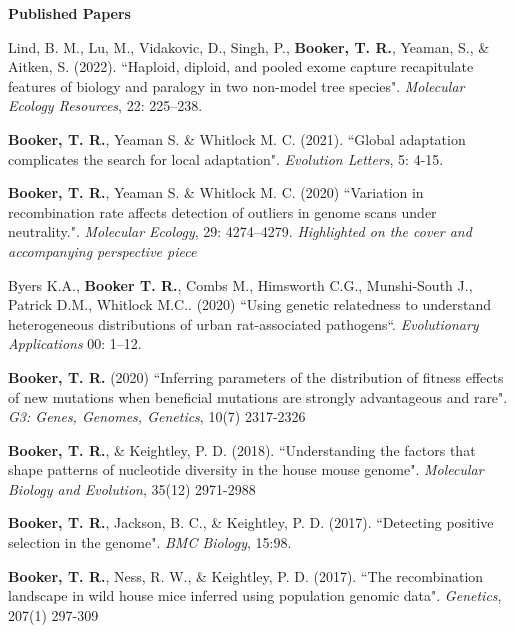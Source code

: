 \documentclass[11pt]{article}
\makeatletter
\newlength{\bibhang}
\newlength{\bibsep}
 {\@listi \global\bibsep\itemsep \global\advance\bibsep by\parsep}
\newenvironment{bibsection}%
        {\begin{etaremune}{}{%
       \setlength{\leftmargin}{\bibhang}%
       \setlength{\itemindent}{-\leftmargin}%
       \setlength{\itemsep}{\bibsep}%
       \setlength{\parsep}{\z@}%
        \setlength{\partopsep}{0pt}%
        \setlength{\topsep}{0pt}}}
        {\end{etaremune}\vspace{-.6\baselineskip}}
\makeatother
\begin{document}
\vspace{.1275in}
\textbf{Published Papers}

\begin{bibsection}


      \item Lind, B. M., Lu, M., Vidakovic, D., Singh, P., { \bf Booker, T. R.}, Yeaman, S., \& Aitken, S. (2022). ``Haploid, diploid, and pooled exome capture recapitulate features of biology and paralogy in two non-model tree species". \emph{Molecular Ecology Resources}, 22: 225–238. 
  
    \item {\bf Booker, T. R.}, Yeaman S. \& Whitlock M. C. (2021). ``Global adaptation complicates the search for local adaptation".  \emph{Evolution Letters}, 5: 4-15. 

    \item {\bf Booker, T. R.}, Yeaman S. \& Whitlock M. C. (2020) ``Variation in recombination rate affects detection of outliers in genome scans under neutrality.". \emph{Molecular Ecology}, 29: 4274–4279. \emph{Highlighted on the cover and accompanying perspective piece}

	\item Byers K.A., {\bf Booker T. R.}, Combs M., Himsworth C.G., Munshi-South J., Patrick D.M., Whitlock M.C.. (2020)  ``Using genetic relatedness to understand heterogeneous distributions of urban rat-associated pathogens``. \emph{Evolutionary Applications} 00: 1–12.
   
    \item {\bf Booker, T. R.} (2020) ``Inferring parameters of the distribution of fitness effects of new mutations when beneficial mutations are strongly advantageous and rare". \\
     \emph{G3: Genes, Genomes, Genetics}, 10(7) 2317-2326

    \item {\bf Booker, T. R.}, \& Keightley, P. D. (2018). ``Understanding the factors that shape patterns of nucleotide diversity in the house mouse genome". \emph{Molecular Biology and Evolution}, 35(12) 2971-2988
    
   \item {\bf Booker, T. R.}, Jackson, B. C., \& Keightley, P. D. (2017). ``Detecting positive selection in the genome". \emph{BMC Biology}, 15:98. 

	\item {\bf Booker, T. R.}, Ness, R. W., \& Keightley, P. D. (2017). ``The recombination landscape in wild house mice inferred using population genomic data". \emph{Genetics}, 207(1) 297-309


\end{bibsection}
\end{document}
